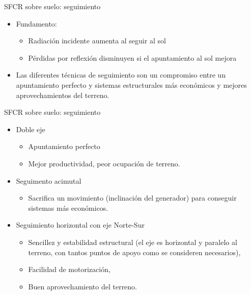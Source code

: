 \documentclass[xcolor={usenames,svgnames,dvipsnames}]{beamer}
\begin{document}
\begin{frame}[label=sec-1-0-8]{SFCR sobre suelo: seguimiento}
\begin{itemize}
\item \alert{Fundamento:}

\begin{itemize}
\item Radiación incidente aumenta al seguir al sol

\item Pérdidas por reflexión disminuyen si el apuntamiento al sol mejora
\end{itemize}

\item Las diferentes técnicas de seguimiento son un compromiso entre un
apuntamiento perfecto y sistemas estructurales más económicos y
mejores aprovechamientos del terreno.
\end{itemize}
\end{frame}

\begin{frame}[label=sec-1-0-9]{SFCR sobre suelo: seguimiento}
\begin{itemize}
\item \alert{Doble eje}

\begin{itemize}
\item Apuntamiento \guillemotleft{}perfecto\guillemotright{}

\item Mejor productividad, peor ocupación de terreno.
\end{itemize}

\item \alert{Seguimento acimutal}

\begin{itemize}
\item Sacrifica un movimiento (inclinación del generador) para conseguir
sistemas más económicos.
\end{itemize}

\item \alert{Seguimiento horizontal con eje Norte-Sur}

\begin{itemize}
\item Sencillez y estabilidad estructural (el eje es horizontal y
paralelo al terreno, con tantos puntos de apoyo como se consideren
necesarios),

\item Facilidad de motorización,

\item Buen aprovechamiento del terreno.
\end{itemize}
\end{itemize}
\end{frame}
\end{document}
